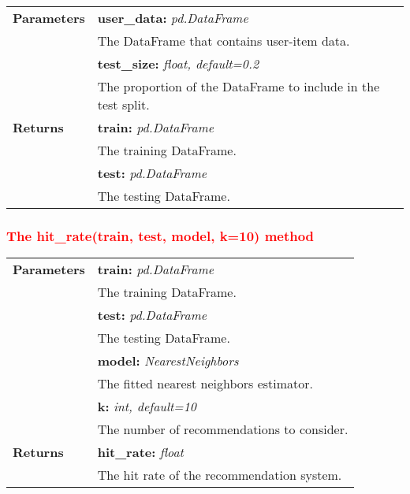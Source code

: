 \vspace{-7mm}
\begin{table}[H]
\small
\begin{tabularx}{\textwidth}{|p{2cm}|X|}
\hline
\textbf{Parameters} & \textbf{user\_data:} \textit{pd.DataFrame} \\ & \hspace{5mm} The DataFrame that contains user-item data. \\
& \textbf{test\_size:} \textit{float, default=0.2} \\ & \hspace{5mm} The proportion of the DataFrame to include in the test split. \\
\textbf{Returns} & \textbf{train:} \textit{pd.DataFrame} \\ & \hspace{5mm} The training DataFrame. \\
& \textbf{test:} \textit{pd.DataFrame} \\ & \hspace{5mm} The testing DataFrame. \\
\hline
\end{tabularx}
\end{table}

\subsubsection{\textcolor{red}{The hit\_rate(train, test, model, k=10) method}}

\vspace{-7mm}
\begin{table}[H]
\small
\begin{tabularx}{\textwidth}{|p{2cm}|X|}
\hline
\textbf{Parameters} & \textbf{train:} \textit{pd.DataFrame} \\ & \hspace{5mm} The training DataFrame. \\
& \textbf{test:} \textit{pd.DataFrame} \\ & \hspace{5mm} The testing DataFrame. \\
& \textbf{model:} \textit{NearestNeighbors} \\ & \hspace{5mm} The fitted nearest neighbors estimator. \\
& \textbf{k:} \textit{int, default=10} \\ & \hspace{5mm} The number of recommendations to consider. \\
\textbf{Returns} & \textbf{hit\_rate:} \textit{float} \\ & \hspace{5mm} The hit rate of the recommendation system. \\
\hline
\end{tabularx}
\end{table}

